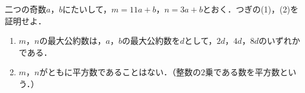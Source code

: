 \documentclass[../../main.tex]{subfiles}
\begin{document}
二つの奇数$a$，$b$にたいして，$m=11a+b$，$n=3a+b$とおく．つぎの(1)，(2)を証明せよ．
\begin{enumerate}
  \item $m$，$n$の最大公約数は，$a$，$b$の最大公約数を$d$として，$2d$，$4d$，$8d$のいずれかである．
  \item $m$，$n$がともに平方数であることはない．（整数の$2$乗である数を平方数という．）
\end{enumerate}
\end{document}
